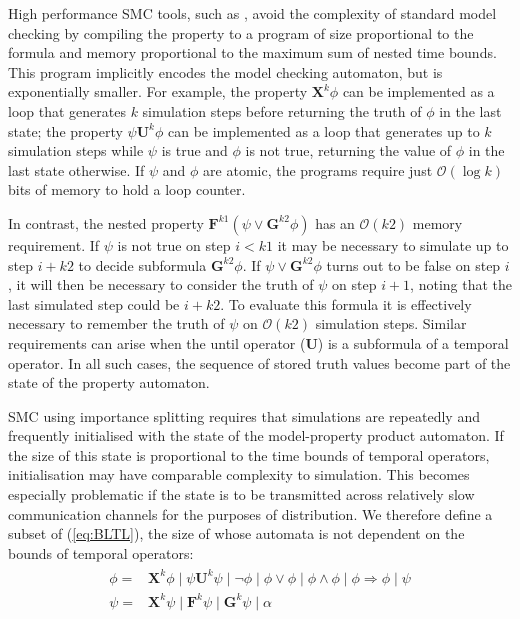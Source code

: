 \documentclass{llncs}
\begin{document}
High performance SMC tools, such as \cite{SedwardsJegourelLegay2012,BoyerCorreLegaySedwards2013},
avoid the complexity of standard model checking by compiling the property
to a program of size proportional to the formula and memory proportional
to the maximum sum of nested time bounds. This program implicitly
encodes the model checking automaton, but is exponentially smaller.
For example, the property $\mathbf{X}^{k}\phi$ can be implemented
as a loop that generates $k$ simulation steps before returning the
truth of $\phi$ in the last state; the property $\psi\mathbf{U}^{k}\phi$
can be implemented as a loop that generates up to $k$ simulation
steps while $\psi$ is true and $\phi$ is not true, returning the
value of $\phi$ in the last state otherwise. If $\psi$ and $\phi$
are atomic, the programs require just $\mathcal{O}(\log k)$ bits
of memory to hold a loop counter.

In contrast, the nested property $\mathbf{F}^{k1}(\psi\vee\mathbf{G}^{k2}\phi)$
has an $\mathcal{O}(k2)$ memory requirement. If $\psi$ is not true
on step $i<k1$ it may be necessary to simulate up to step $i+k2$
to decide subformula $\mathbf{G}^{k2}\phi$. If $\psi\vee\mathbf{G}^{k2}\phi$
turns out to be false on step $i$, it will then be necessary to consider
the truth of $\psi$ on step $i+1$, noting that the last simulated
step could be $i+k2$. To evaluate this formula it is effectively
necessary to remember the truth of $\psi$ on $\mathcal{O}(k2)$ simulation
steps. Similar requirements can arise when the until operator ($\mathbf{U}$)
is a subformula of a temporal operator. In all such cases, the sequence
of stored truth values become part of the state of the property automaton.

SMC using importance splitting requires that simulations are repeatedly
and frequently initialised with the state of the model-property product
automaton. If the size of this state is proportional to the time bounds
of temporal operators, initialisation may have comparable complexity
to simulation. This becomes especially problematic if the state is
to be transmitted across relatively slow communication channels for
the purposes of distribution. We therefore define a subset of (\ref{eq:BLTL}),
the size of whose automata is not dependent on the bounds of temporal
operators:
\begin{equation}
\begin{aligned}\begin{split}\phi= & \mathbf{X}^{k}\phi\mid\psi\mathbf{U}^{k}\psi\mid\neg\phi\mid\phi\vee\phi\mid\phi\wedge\phi\mid\phi\Rightarrow\phi\mid\psi\\
\psi= & \mathbf{X}^{k}\psi\mid\mathbf{F}^{k}\psi\mid\mathbf{G}^{k}\psi\mid\alpha
\end{split}
\end{aligned}
\label{eq:ISPLTL}
\end{equation}
\end{document}
